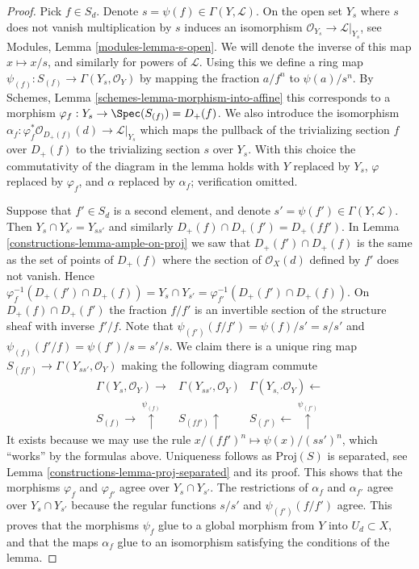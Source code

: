 \begin{proof}

Pick $f \in S_d$. Denote $s = \psi(f) \in \Gamma(Y, \mathcal{L})$.
On the open set $Y_s$ where $s$ does not vanish multiplication
by $s$ induces an isomorphism $\mathcal{O}_{Y_s} \to \mathcal{L}|_{Y_s}$,
see Modules, Lemma \ref{modules-lemma-s-open}. We will denote
the inverse of this map $x \mapsto x/s$, and similarly for
powers of $\mathcal{L}$. Using this we
define a ring map $\psi_{(f)} : S_{(f)} \to \Gamma(Y_s, \mathcal{O}_Y)$
by mapping the fraction $a/f^n$ to $\psi(a)/s^n$.
By Schemes, Lemma \ref{schemes-lemma-morphism-into-affine}
this corresponds to a morphism
$\varphi_f : Y_s \to \Spec(S_{(f)}) = D_{+}(f)$.
We also introduce the isomorphism
$\alpha_f : \varphi_f^*\mathcal{O}_{D_{+}(f)}(d) \to \mathcal{L}|_{Y_s}$
which maps the pullback of the trivializing section
$f$ over $D_{+}(f)$ to the trivializing section $s$ over $Y_s$.
With this choice the commutativity of the diagram in the lemma
holds with $Y$ replaced by $Y_s$, $\varphi$ replaced by $\varphi_f$,
and $\alpha$ replaced by $\alpha_f$; verification omitted.

\medskip\noindent
Suppose that $f' \in S_d$ is a second element, and denote
$s' = \psi(f') \in \Gamma(Y, \mathcal{L})$. Then
$Y_s \cap Y_{s'} = Y_{ss'}$ and similarly
$D_{+}(f) \cap D_{+}(f') = D_{+}(ff')$.
In Lemma \ref{constructions-lemma-ample-on-proj} we saw that
$D_{+}(f') \cap D_{+}(f)$ is the same as the set
of points of $D_{+}(f)$ where the section of
$\mathcal{O}_X(d)$ defined by $f'$ does not vanish.
Hence
$\varphi_f^{-1}(D_{+}(f') \cap D_{+}(f)) = Y_s \cap Y_{s'}
= \varphi_{f'}^{-1}(D_{+}(f') \cap D_{+}(f))$.
On $D_{+}(f) \cap D_{+}(f')$ the fraction $f/f'$ is an
invertible section of the structure sheaf with inverse
$f'/f$. Note that $\psi_{(f')}(f/f') = \psi(f)/s' = s/s'$
and $\psi_{(f)}(f'/f) = \psi(f')/s = s'/s$. We claim there
is a unique ring map
$S_{(ff')} \to \Gamma(Y_{ss'}, \mathcal{O}_Y)$ making the
following diagram commute
$$
\begin{array}{ccc}\Gamma(Y_s, \mathcal{O}_Y) \longrightarrow & \Gamma(Y_{ss'}, \mathcal{O}_Y) & \Gamma(Y_{s, '} \mathcal{O}_Y) \longleftarrow \\ S_{(f)} \longrightarrow\overset{\psi_{(f)}}{\uparrow} & S_{(ff')} \uparrow & S_{(f')} \longleftarrow\overset{\psi_{(f')}}{\uparrow}\end{array}
$$
It exists because we may use the rule
$x/(ff')^n \mapsto \psi(x)/(ss')^n$, which ``works'' by the formulas
above. Uniqueness follows as $\text{Proj}(S)$ is separated, see
Lemma \ref{constructions-lemma-proj-separated} and its proof. This shows that the
morphisms $\varphi_f$ and $\varphi_{f'}$ agree over $Y_s \cap Y_{s'}$.
The restrictions of $\alpha_f$ and $\alpha_{f'}$ agree over
$Y_s \cap Y_{s'}$ because the regular functions $s/s'$ and
$\psi_{(f')}(f/f')$ agree. This proves that the morphisms $\psi_f$
glue to a global morphism from $Y$ into $U_d \subset X$, and
that the maps $\alpha_f$ glue to an isomorphism satisfying the
conditions of the lemma.


\end{proof}
